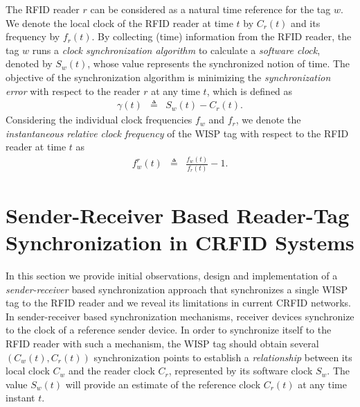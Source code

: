 \documentclass[10pt,journal,compsoc]{IEEEtran}
\begin{document}
The RFID reader $r$ can be considered as a natural time reference for the tag $w$. We denote the local clock of the RFID reader at time $t$ by $C_{r}(t)$ and its frequency by $f_r(t)$. By collecting (time) information from the RFID reader, the tag $w$ runs a \emph{clock synchronization algorithm} to calculate a \emph{software clock}, denoted by $S_{w}(t)$, whose value represents the synchronized notion of time. The objective of the synchronization algorithm is minimizing the \emph{synchronization error} with respect to the reader $r$ at any time $t$, which is defined as 
%
\begin{eqnarray}
\gamma(t)&\triangleq&S_w(t)-C_r(t). \label{eq:gamma_error}
\end{eqnarray}
%
Considering the individual clock frequencies $f_w$ and $f_r$, we denote the \emph{instantaneous relative clock 
	frequency} of the WISP tag 
with respect to the RFID reader at time $t$ as
%
\begin{eqnarray}
f_w^r(t)&\triangleq&\frac{f_w(t)}{f_r(t)}-1. \label{eq:relative_frequency}	
\end{eqnarray}
\section{Sender-Receiver Based Reader-Tag Synchronization in CRFID Systems}
\label{sec:sender_receiver}

In this section we provide initial observations, design and implementation of a \emph{sender-receiver} based synchronization approach that synchronizes a single WISP tag to the RFID reader and we reveal its limitations in current CRFID networks. In sender-receiver based synchronization mechanisms, receiver devices synchronize to the clock of a reference sender device. In order to synchronize itself to the RFID reader with such a mechanism, the WISP tag should obtain several $(C_w(t),C_r(t))$ synchronization points to establish a \emph{relationship} between its local clock $C_w$ and the reader clock $C_r $, represented by its software clock $S_w$. The value $S_w(t)$ will provide an estimate of the reference clock $C_r(t)$ at any time instant $t$.
\end{document}
